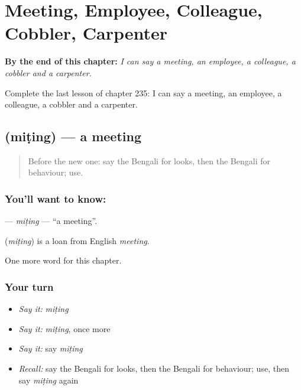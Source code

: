 
\chapter{Meeting, Employee, Colleague, Cobbler, Carpenter}
\label{ch:bn-meeting-employee-colleague-cobbler-carpenter}

\begin{chapteropening}
\textbf{By the end of this chapter:} \emph{I can say a meeting, an employee, a colleague, a cobbler and a carpenter.}

Complete the last lesson of chapter 235: I can say a meeting, an employee, a colleague, a cobbler and a carpenter.
\end{chapteropening}

\section[\texorpdfstring{\bn{মিটিং} (miṭing)}{মিটিং (miṭing)}]{ (miṭing) — a meeting}

\label{lesson:BN-C235-miting}



\begin{quote}
Before the new one: say the Bengali for looks, then the Bengali for behaviour; use.
\end{quote}

\subsection*{You'll want to know: }
\textbf{} — \emph{miṭing} — \textquotedblleft{}a meeting\textquotedblright{}.

\begin{cousinweb}
\textbf{} (\emph{miṭing}) is a loan from English \emph{meeting}.
\end{cousinweb}

\begin{grammarlens}[title={What you've built}]
One more word for this chapter.
\end{grammarlens}

\subsection*{Your turn}
\begin{itemize}
\raggedright
  \item \emph{Say it:} \emph{miṭing}
  \item \emph{Say it:} \emph{miṭing}, once more
  \item \emph{Say it:} say \emph{miṭing}
  \item \emph{Recall:} say the Bengali for looks, then the Bengali for behaviour; use, then say \emph{miṭing} again
\end{itemize}

